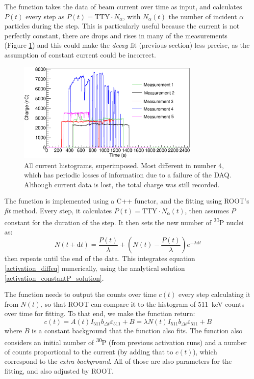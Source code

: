 \documentclass[a4paper,12pt]{report}
\newcommand{\dif}{\text{d}}
\newcommand{\Piso}{\textsuperscript{30}P }
\begin{document}
The function takes the data of beam current over time as input, and calculates $P(t)$ every step as $P(t) = \text{TTY}\cdot N_\alpha$, with $N_\alpha(t)$ the number of incident $\alpha$ particles during the step.
This is particularly useful because the current is not perfectly constant, there are drops and rises in many of the measurements (Figure \ref{current_histograms}) and this could make the \textit{decay} fit (previous section) less precise, as the assumption of constant current could be incorrect.
\\
\begin{figure}[H]
	\centering
	\includegraphics[width=0.80\textwidth]{current_histograms.eps}
	\caption{All current histograms, superimposed.
	Most different in number 4, which has periodic losses of information due to a failure of the DAQ.
	Although current data is lost, the total charge was still recorded.}
	\label{current_histograms}
\end{figure}

The function is implemented using a C++ functor, and the fitting using ROOT's \textit{fit} method.
Every step, it calculates $P(t) = \text{TTY}\cdot N_\alpha(t)$, then assumes $P$ constant for the duration of the step.
It then sets the new number of \Piso nuclei as:
\begin{equation}
	N(t+\dif t)=\frac{P(t)}{\lambda} + \left( N(t)-\frac{P(t)}{\lambda} \right) e^{-\lambda \dif t}
\end{equation}
then repeats until the end of the data.
This integrates equation \ref{activation_diffeq} numerically, using the analytical solution \ref{activation_constantP_solution}.

The function needs to output the counts over time $c(t)$ every step calculating it from $N(t)$, so that ROOT can compare it to the histogram of \qty{511}{\keV} counts over time for fitting.
To that end, we make the function return:
\[ c(t) = A(t)I_{511}b_{\Delta t}\varepsilon_{511} + B = \lambda N(t) I_{511}b_{\Delta t}\varepsilon_{511} + B\]
where $B$ is a constant background that the function also fits.
The function also considers an initial number of \Piso (from previous activation runs) and a number of counts proportional to the current (by adding that to $c(t)$), which correspond to the \textit{extra background}.
All of those are also parameters for the fitting, and also adjusted by ROOT.
\end{document}
